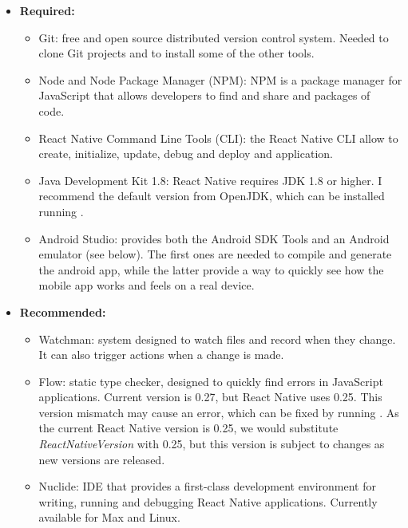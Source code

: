 \lstset{style=mybash}


\begin{itemize}
  \item \textbf{Required:}
    \begin{itemize}
      \item Git: free and open source distributed version control system. Needed to clone Git projects and to install some of the other tools.~\cite{git}
      \item Node and Node Package Manager (NPM): NPM is a package manager for JavaScript that allows developers to find and share and packages of code.~\cite{node}~\cite{npm}
      \item React Native Command Line Tools (CLI): the React Native CLI allow to create, initialize, update, debug and deploy and application.~\cite{rncli}
      \item Java Development Kit 1.8: React Native requires JDK 1.8 or higher. I recommend the default version from OpenJDK, which can be installed running .~\cite{jdk}
      \item Android Studio: provides both the Android SDK Tools and an Android emulator (see below). The first ones are needed to compile and generate the android app, while the latter provide a way to quickly see how the mobile app works and feels on a real device.~\cite{androidstudio}
    \end{itemize}

  \item \textbf{Recommended:}
    \begin{itemize}
      \item Watchman: system designed to watch files and record when they change. It can also trigger actions when a change is made.~\cite{watchman}
      \item Flow: static type checker, designed to quickly find errors in JavaScript applications. Current version is 0.27, but React Native uses 0.25. This version mismatch may cause an error, which can be fixed by running . As the current React Native version is 0.25, we would substitute \textit{ReactNativeVersion} with 0.25, but this version is subject to changes as new versions are released.~\cite{flow}
      \item Nuclide: IDE that provides a first-class development environment for writing, running and debugging React Native applications. Currently available for Max and Linux.~\cite{nuclide}
    \end{itemize}
  

\end{itemize}
